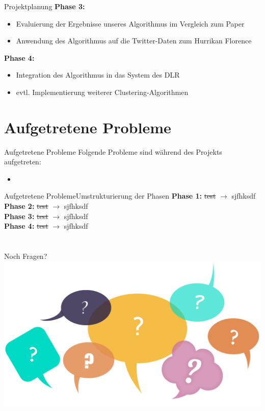 \documentclass[12pt, xcolor={usenames,dvipsnames,svgnames,x11names,table}]{beamer}
\begin{document}
	\begin{frame}{Projektplanung}{}
		\textbf{Phase 3:}
		\begin{itemize}
			\item Evaluierung der Ergebnisse unseres Algorithmus im Vergleich zum Paper
			\item Anwendung des Algorithmus auf die Twitter-Daten zum Hurrikan Florence
		\end{itemize}\bigskip
		
		\textbf{Phase 4:}
		\begin{itemize}
			\item Integration des Algorithmus in das System des DLR
			\item evtl. Implementierung weiterer Clustering-Algorithmen
		\end{itemize}
	\end{frame}
	
	
	\section{Aufgetretene Probleme}
	\begin{frame}{Aufgetretene Probleme}{}
		Folgende Probleme sind während des Projekts aufgetreten:
		
		\begin{itemize}
			\item 
		\end{itemize}
	\end{frame}
	
	\begin{frame}{Aufgetretene Probleme}{Umstrukturierung der Phasen}
		\textbf{Phase 1:} \sout{test} $\longrightarrow$ sjfhksdf\bigskip\\
		\textbf{Phase 2:} \sout{test} $\longrightarrow$ sjfhksdf\bigskip\\
		\textbf{Phase 3:} \sout{test} $\longrightarrow$ sjfhksdf\bigskip\\
		\textbf{Phase 4:} \sout{test} $\longrightarrow$ sjfhksdf
	\end{frame}
	
	
	\section{}
	\begin{frame}{Noch Fragen?}
		\includegraphics[width=\textwidth]{fragen}
	\end{frame}
\end{document}
